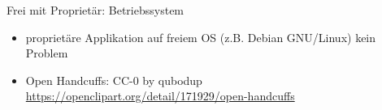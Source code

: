 \begin{frame}{Frei mit Proprietär: Betriebssystem}
{\begin{center}
		\end{center}
	}
\end{frame}
\note
{
	\begin{itemize}
		\item proprietäre Applikation auf freiem OS (z.B. Debian GNU/Linux) kein Problem
		\item Open Handcuffs: CC-0 by qubodup \url{https://openclipart.org/detail/171929/open-handcuffs}
	\end{itemize}
}

